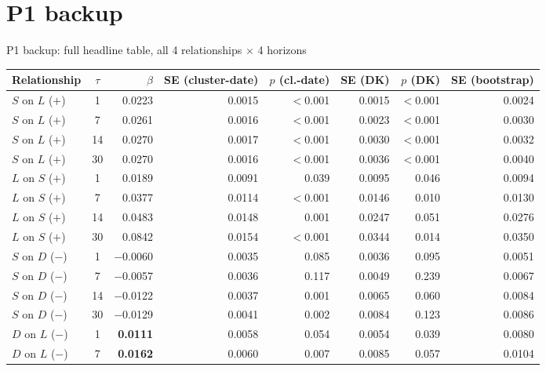 \documentclass[aspectratio=169]{beamer}
\begin{document}
\section{P1 backup}

\begin{frame}{P1 backup: full headline table, all 4 relationships $\times$ 4 horizons}
  \tiny
  \begin{center}
  \begin{tabular}{@{}l c r r r r r r@{}}
    \toprule
    Relationship & $\tau$ & $\beta$ & SE (cluster-date) & $p$ (cl.-date) & SE (DK) & $p$ (DK) & SE (bootstrap) \\
    \midrule
    $S$ on $L$ ($+$) & 1  & 0.0223 & 0.0015 & $<$0.001 & 0.0015 & $<$0.001 & 0.0024 \\
    $S$ on $L$ ($+$) & 7  & 0.0261 & 0.0016 & $<$0.001 & 0.0023 & $<$0.001 & 0.0030 \\
    $S$ on $L$ ($+$) & 14 & 0.0270 & 0.0017 & $<$0.001 & 0.0030 & $<$0.001 & 0.0032 \\
    $S$ on $L$ ($+$) & 30 & 0.0270 & 0.0016 & $<$0.001 & 0.0036 & $<$0.001 & 0.0040 \\
    \midrule
    $L$ on $S$ ($+$) & 1  & 0.0189 & 0.0091 & 0.039 & 0.0095 & 0.046 & 0.0094 \\
    $L$ on $S$ ($+$) & 7  & 0.0377 & 0.0114 & $<$0.001 & 0.0146 & 0.010 & 0.0130 \\
    $L$ on $S$ ($+$) & 14 & 0.0483 & 0.0148 & 0.001 & 0.0247 & 0.051 & 0.0276 \\
    $L$ on $S$ ($+$) & 30 & 0.0842 & 0.0154 & $<$0.001 & 0.0344 & 0.014 & 0.0350 \\
    \midrule
    $S$ on $D$ ($-$) & 1  & $-$0.0060 & 0.0035 & 0.085 & 0.0036 & 0.095 & 0.0051 \\
    $S$ on $D$ ($-$) & 7  & $-$0.0057 & 0.0036 & 0.117 & 0.0049 & 0.239 & 0.0067 \\
    $S$ on $D$ ($-$) & 14 & $-$0.0122 & 0.0037 & 0.001 & 0.0065 & 0.060 & 0.0084 \\
    $S$ on $D$ ($-$) & 30 & $-$0.0129 & 0.0041 & 0.002 & 0.0084 & 0.123 & 0.0086 \\
    \midrule
    $D$ on $L$ ($-$) & 1  & \textbf{0.0111} & 0.0058 & 0.054 & 0.0054 & 0.039 & 0.0080 \\
    $D$ on $L$ ($-$) & 7  & \textbf{0.0162} & 0.0060 & 0.007 & 0.0085 & 0.057 & 0.0104 \\

\end{tabular}
\end{center}
\end{frame}
\end{document}
